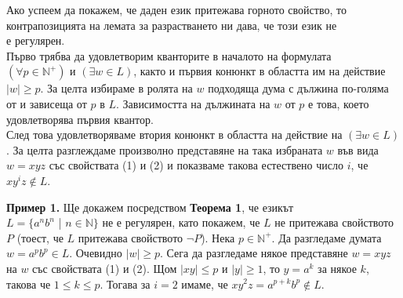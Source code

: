 \documentclass{article}
\begin{document}
    Ако успеем да покажем, че даден език притежава горното свойство, то контрапозицията
    на лемата за разрастването ни дава, че този език не \\ е регулярен. \\
    \hspace{15pt} Първо трябва да 
    удовлетворим кванторите в началото на формулата \\ $\boxed{(\forall p \in \mathbb{N}^+)}$ и
    $\boxed{(\exists w \in L)}$, както и първия конюнкт в областта им на действие 
    $\boxed{|w| \geq p}$. За целта избираме в ролята на $w$ подходяща дума с дължина по-голяма от и зависеща от $p$
    в $L$. Зависимостта на дължината на $w$ от $p$ е това, което удовлетворява първия
    квантор. \\ 
    \hspace{15pt} След това удовлетворяваме втория конюнкт в областта на действие на  
    $\boxed{(\exists w \in L)}$. За целта разглеждаме произволно представяне на 
    така избраната $w$
    във вида $w = xyz$ със свойствата (1) и (2) и показваме такова естествено число $i$,
    че $xy^iz \notin L$.

    \vspace{15pt}

    \textbf{Пример 1.} Ще докажем посредством \textbf{Теорема 1}, че езикът \\
    $L = \{a^nb^n$ | $n \in \mathbb{N}\}$ не е регулярен, като покажем, че $L$ не
    притежава свойството $P$ (тоест, че $L$ притежава свойството $\neg P$). Нека $p \in \mathbb{N^+}$. Да разгледаме думата 
    $w = a^pb^p \in L$. Очевидно $|w| \geq p$. Сега да разгледаме някое представяне
    $w = xyz$ на $w$ със свойствата (1) и (2). Щом $|xy| \leq p$ и $|y| \geq 1$, то 
    $y = a^k$ за някое $k$, такова че $1 \leq k \leq p$. Тогава за $i = 2$ имаме, че 
    $xy^2z = a^{p+k}b^p \notin L$. 

    \vspace{15pt}
\end{document}
